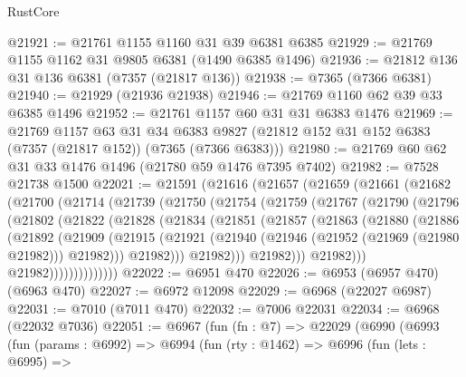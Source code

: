 \begin{lexlean}{RustCore}
\begin{coremodule}
@21921 := @21761 @1155 @1160 @31 @39 @6381 @6385
@21929 := @21769 @1155 @1162 @31 @9805 @6381 (@1490 @6385 @1496)
@21936 := @21812 @136 @31 @136 @6381 (@7357 (@21817 @136))
@21938 := @7365 (@7366 @6381)
@21940 := @21929 (@21936 @21938)
@21946 := @21769 @1160 @62 @39 @33 @6385 @1496
@21952 := @21761 @1157 @60 @31 @31 @6383 @1476
@21969 := @21769
    @1157
    @63
    @31
    @34
    @6383
    @9827
    (@21812 @152 @31 @152 @6383 (@7357 (@21817 @152)) (@7365 (@7366 @6383)))
@21980 := @21769 @60 @62 @31 @33 @1476 @1496 (@21780 @59 @1476 @7395 @7402)
@21982 := @7528 @21738 @1500
@22021 := @21591
    (@21616
      (@21657
        (@21659
          (@21661
            (@21682
              (@21700
                (@21714
                  (@21739
                    (@21750
                      (@21754
                        (@21759
                          (@21767
                            (@21790
                              (@21796
                                (@21802
                                  (@21822
                                    (@21828
                                      (@21834
                                        (@21851
                                          (@21857
                                            (@21863
                                              (@21880
                                                (@21886
                                                  (@21892
                                                    (@21909
                                                      (@21915
                                                        (@21921
                                                          (@21940
                                                            (@21946
                                                              (@21952 (@21969 (@21980 @21982)))
                                                              @21982)))
                                                        @21982)))
                                                  @21982)))
                                            @21982)))
                                      @21982)))
                                @21982))))))))))))))
@22022 := @6951 @470
@22026 := @6953 (@6957 @470) (@6963 @470)
@22027 := @6972 @12098
@22029 := @6968 (@22027 @6987)
@22031 := @7010 (@7011 @470)
@22032 := @7006 @22031
@22034 := @6968 (@22032 @7036)
@22051 := @6967
    (fun (fn : @7) =>
    @22029
      (@6990
        (@6993
          (fun (params : @6992) =>
          @6994
            (fun (rty : @1462) =>
            @6996
              (fun (lets : @6995) =>

\end{coremodule}
\end{lexlean}
